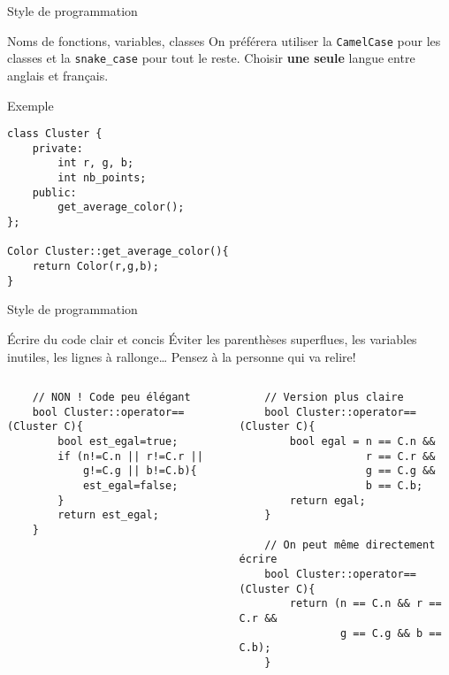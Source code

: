 \begin{frame}[fragile]{Style de programmation}

\begin{block}{Noms de fonctions, variables, classes}
	On préférera utiliser la \texttt{CamelCase} pour les classes et la \texttt{snake_case} pour tout le reste. Choisir \textbf{une seule} langue entre anglais et français.
\end{block}

\begin{exampleblock}{Exemple}
\begin{verbatim}
class Cluster {
    private:
        int r, g, b;
        int nb_points;
    public:
        get_average_color();
};

Color Cluster::get_average_color(){
    return Color(r,g,b);
}
\end{verbatim}
\end{exampleblock}
\end{frame}

\begin{frame}[fragile]{Style de programmation}
\begin{block}{Écrire du code clair et concis}
	Éviter les parenthèses superflues, les variables inutiles, les lignes à rallonge\dots{} Pensez à la personne qui va relire!
\end{block}

\begin{columns}[T]
    \begin{column}{0.52\textwidth}
    \begin{verbatim}
    // NON ! Code peu élégant
    bool Cluster::operator==(Cluster C){
        bool est_egal=true;
        if (n!=C.n || r!=C.r ||
            g!=C.g || b!=C.b){
            est_egal=false;
        }
        return est_egal;
    }
    \end{verbatim}
    \end{column}
    \begin{column}{0.52\textwidth}
    \begin{verbatim}
    // Version plus claire
    bool Cluster::operator==(Cluster C){
        bool egal = n == C.n &&
                    r == C.r &&
                    g == C.g &&
                    b == C.b;
        return egal;
    }

    // On peut même directement écrire 
    bool Cluster::operator==(Cluster C){
        return (n == C.n && r == C.r &&
                g == C.g && b == C.b);
    }
    \end{verbatim}
    \end{column}
\end{columns}
\end{frame}

